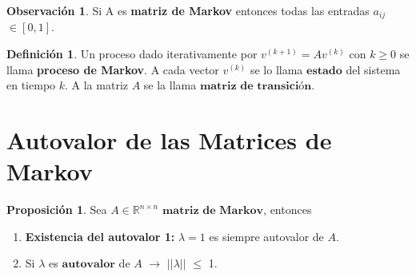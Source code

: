 \documentclass[11pt,a4paper]{article}
\theoremstyle{definition}
\newtheorem{definicion}{Definición}
\newtheorem{proposicion}{Proposición}
\newtheorem{observacion}{Observación}
\begin{document}
\begin{observacion}
    Si A es \textbf{matriz de Markov} entonces todas las entradas $a_{ij}$ $\in [0,1]$.
\end{observacion}

\begin{definicion} 
    Un proceso dado iterativamente por $v^{(k+1)} = A v^{(k)}$ con $k \geq 0$ se llama \textbf{proceso de Markov}. A cada vector $v^{(k)}$ se lo llama $\textbf{estado}$ del sistema en tiempo $k$. A la matriz $A$ se la llama $\textbf{matriz de transición}$.
\end{definicion}

\section{Autovalor de las Matrices de Markov}

\begin{proposicion}
    Sea $A \in \mathbb{R}^{n \times n}$ $\textbf{matriz de Markov}$, entonces
    \begin{enumerate}
        \item \textbf{Existencia del autovalor 1:} $\lambda = 1$ es siempre autovalor de $A$.
        \item Si $\lambda$ es $\textbf{autovalor}$ de $A$ $\rightarrow$ $\vert\vert \lambda \vert\vert$ $\leq$ 1. 
    \end{enumerate}
\end{proposicion}
\end{document}
